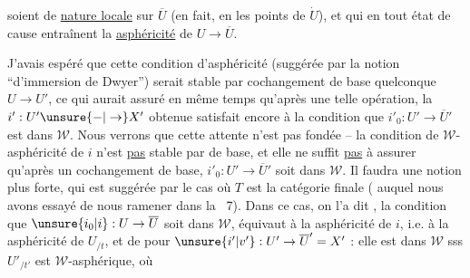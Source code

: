 
soient de \uline{nature locale} sur $\overline U$ (en fait, en les
points de $\dot U$), et  qui
 en tout état de cause entraînent
la \uline{asphéricité} de $U\to\overline U$.

J'avais espéré que cette condition d'asphéricité (suggérée par la notion ``d'immersion
de Dwyer'') serait stable par cochangement
de base quelconque $U\to U'$, ce qui aurait
assuré en même temps qu'après une telle
opération, la  $i':U'\unsure{-|\to}X'$ obtenue satisfait
encore à la condition que $i'_0:U'\to\overline U'$ est
dans $\mathcal W$. Nous verrons que cette attente n'est
pas fondée -- la condition de $\mathcal W$-asphéricité de $i$
n'est \uline{pas} stable par  de base, et elle
ne suffit \uline{pas}  à assurer qu'après un 
cochangement de base, $i'_0:U'\to\overline U'$ soit dans $\mathcal W$.
Il faudra une notion plus forte, qui est
suggérée par le cas où $T$ est la catégorie finale
( auquel nous avons essayé de nous ramener dans la ~7). Dans ce cas, on l'a dit ,
la condition que $\unsure{i_0|i}:U\to\overline U$ soit dans $\mathcal W$, équivaut
à la asphéricité de $i$, i.e. à la asphéricité de
$U_{/t}$, et de  pour $\unsure{i'|v'}:U'\to\overline U'=X'$ : elle
est dans $\mathcal W$ sss $U'_{/t'}$ est $\mathcal W$-asphérique, où


